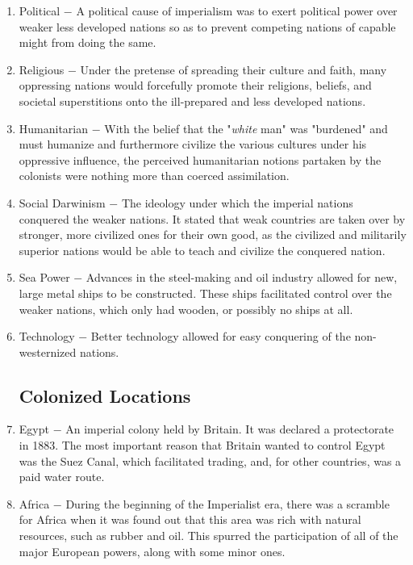 \documentclass[12pt]{article}
\begin{document}
\begin{enumerate}
\item Political $-$ A political cause of imperialism was to exert political power over weaker less developed nations so as to prevent competing nations of capable might from doing the same. 

\item Religious $-$ Under the pretense of spreading their culture and faith, many oppressing nations would forcefully promote their religions, beliefs, and societal superstitions onto the ill-prepared and less developed nations.

\item Humanitarian $-$ With the belief that the "\textit{white} man" was "burdened" and must humanize and furthermore civilize the various cultures under his oppressive influence, the perceived humanitarian notions partaken by the colonists were nothing more than coerced assimilation. 

\item Social Darwinism $-$ The ideology under which the imperial nations conquered the weaker nations. It stated that weak countries are taken over by stronger, more civilized ones for their own good, as the civilized and militarily superior nations would be able to teach and civilize the conquered nation.  

\item Sea Power $-$ Advances in the steel-making and oil industry allowed for new, large metal ships to be constructed. These ships facilitated control over the weaker nations, which only had wooden, or possibly no ships at all.

\item Technology $-$ Better technology allowed for easy conquering of the non-westernized nations.

\subsection{Colonized Locations}

\item Egypt $-$ An imperial colony held by Britain. It was declared a protectorate in 1883. The most important reason that Britain wanted to control Egypt was the Suez Canal, which facilitated trading, and, for other countries, was a paid water route.

\item Africa $-$ During the beginning of the Imperialist era, there was a scramble for Africa when it was found out that this area was rich with natural resources, such as rubber and oil. This spurred the participation of all of the major European powers, along with some minor ones. 


\end{enumerate}
\end{document}

